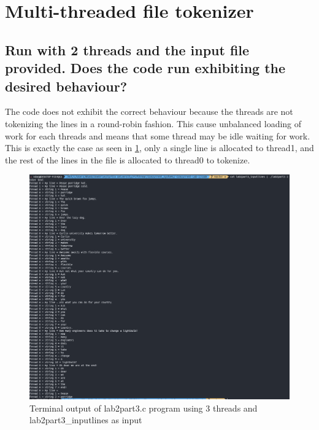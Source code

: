 

\section{Multi-threaded file tokenizer}

\subsection{Run with 2 threads and the input file provided. Does the code run exhibiting the desired
behaviour?}

The code does not exhibit the correct behaviour because the threads are not tokenizing the lines in a
round-robin fashion. This cause unbalanced loading of work for each threads and means that some thread may
be idle waiting for work. This is exactly the case as seen in \cref{fig:lab2part3}, only a single line
is allocated to thread1, and the rest of the lines in the file is allocated to thread0 to tokenize.

\begin{figure}[ht]
    \centering
    \includegraphics[width=\textwidth]{Figures/part3_2.PNG}
    \caption{Terminal output of lab2part3.c program using 3 threads and lab2part3\_inputlines as input}
    \label{fig:lab2part3}
\end{figure}

